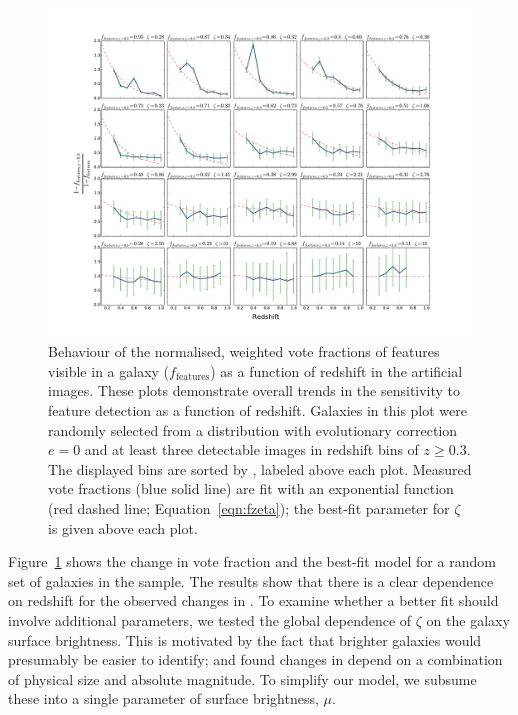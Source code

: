 \documentclass[a4paper,fleqn,usenatbib]{mnras}
\begin{document}
\begin{figure}
\center
\includegraphics[width=\textwidth]{figures/zeta_examples_sorted.pdf}
\caption{Behaviour of the normalised, weighted vote fractions of features
visible in a galaxy ($f_\textrm{features}$) as a function of redshift in the
artificial \ferengi{} images. These plots demonstrate overall trends
in the sensitivity to feature detection as a function of redshift.
Galaxies in this plot were randomly selected from
a distribution with evolutionary correction $e=0$ and at least three detectable images 
in redshift bins of $z\ge0.3$. The displayed bins are sorted by \ffeaturesrest, 
labeled above each plot. Measured vote fractions (blue
solid line) are fit with an exponential function (red dashed line;
Equation~\ref{eqn:fzeta}); the best-fit parameter for $\zeta$ is given above
each plot.}
\label{fig:zeta_examples}
\end{figure}

Figure~\ref{fig:zeta_examples} shows the change in vote fraction and the
best-fit model for a random set of galaxies in the \ferengi{} sample. The
results show that there is a clear dependence on redshift for the observed
changes in \ffeatures. To examine whether a better fit should involve
additional parameters, we tested the global dependence of $\zeta$ on the
galaxy surface brightness. This is motivated by the fact that brighter galaxies
would presumably be easier to identify; \citet{bam09} and \citet{wil13} found
changes in \ffeatures{} depend on a combination of physical size and
absolute magnitude. To simplify our model, we subsume these into a single
parameter of surface brightness, $\mu$.
\end{document}

